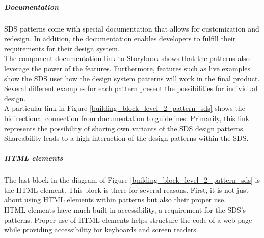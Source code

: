 \subparagraph{Documentation}
\ac{SDS} patterns come with special documentation that allows for customization and redesign. In addition, the documentation enables developers to fulfill their requirements for their design system.\\
The component documentation link to Storybook shows that the patterns also leverage the power of the features. Furthermore, features such as live examples show the \ac{SDS} user how the design system patterns will work in the final product. Several different examples for each pattern present the possibilities for individual design. \\
A particular link in Figure \ref{building_block_level_2_pattern_sds} shows the bidirectional connection from documentation to guidelines. Primarily, this link represents the possibility of sharing own variants of the \ac{SDS} design patterns. Shareability leads to a high interaction of the design patterns within the \acl{SDS}. 

\subparagraph{\ac{HTML} elements}
The last block in the diagram of Figure \ref{building_block_level_2_pattern_sds} is the \ac{HTML} element. This block is there for several reasons. First, it is not just about using \ac{HTML} elements within patterns but also their proper use. \\
\ac{HTML} elements have much built-in accessibility, a requirement for the SDS's patterns. Proper use of \ac{HTML} elements helps structure the code of a web page while providing accessibility for keyboards and screen readers. \citep{mdn_html_nodate}

